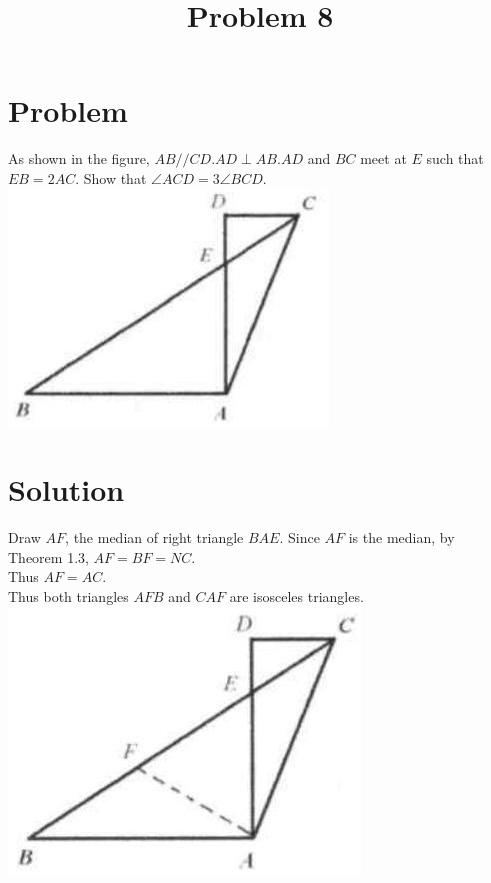 \documentclass{article}
\title{Problem 8}
\date{}
\begin{document}
\maketitle

\section*{Problem}
As shown in the figure, \(A B / / C D . A D \perp A B . A D\) and \(B C\) meet at \(E\) such that \(E B=2 A C\). Show that \(\angle A C D=3 \angle B C D\).\\
\centering
\includegraphics[width=\textwidth]{images/016(2).jpg}

\section*{Solution}
Draw \(A F\), the median of right triangle \(B A E\). Since \(A F\) is the median, by Theorem 1.3, \(A F=B F=N C\).\\
Thus \(A F=A C\).\\
Thus both triangles \(A F B\) and \(C A F\) are isosceles triangles.\\
\centering
\includegraphics[width=\textwidth]{images/020(3).jpg}
\end{document}
